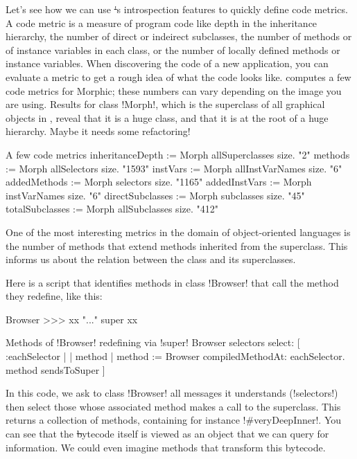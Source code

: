 \documentclass[a4paper,10pt,twoside]{book}
\begin{document}
Let's see how we can use \st's introspection features to quickly define code metrics.
A code metric is a measure of program code like depth in the inheritance hierarchy, the number of direct or indeirect subclasses, the number of methods or of instance variables in each class, or the number of locally defined methods or instance variables.
When discovering the code of a new application, you can evaluate a metric to get a rough idea of what the code looks like.
 computes a few code metrics for Morphic; these numbers can vary depending on the image you are using.
Results for class \ct!Morph!, which is the superclass of all graphical objects in \sq, reveal that it is a huge class, and that it is at the root of a huge hierarchy. Maybe it needs some refactoring!

\begin{script}[metrics]{A few code metrics}
	inheritanceDepth := Morph allSuperclasses size. "2"
	methods := Morph allSelectors size. "1593"
	instVars := Morph allInstVarNames size. "6"
	addedMethods := Morph selectors size. "1165"
	addedInstVars := Morph instVarNames size. "6"
	directSubclasses := Morph subclasses size. "45"
	totalSubclasses := Morph allSubclasses size. "412"
\end{script}

One of the most interesting metrics in the domain of object-oriented languages is the number of methods that extend methods inherited from the superclass.
This informs us about the relation between the class and its superclasses.

Here is a script that identifies methods in class \ct!Browser! that call the method they redefine, like this:
\begin{code}{}
Browser >>> xx
	"..."
	super xx
\end{code}

\begin{script}[browsersendstosuper]{Methods of \ct!Browser! redefining via \ct!super!}
Browser selectors select: [ :eachSelector |
	| method |
	method := Browser compiledMethodAt: eachSelector.
	method sendsToSuper ]
\end{script}

In this code, we ask to class \ct!Browser! all messages it understands (\ct!selectors!) then select those whose associated method makes a call to the superclass.
This returns a collection of methods, containing for instance \ct!#veryDeepInner!.
You can see that the \st bytecode itself is viewed as an object that we can query for information.
We could even imagine methods that transform this bytecode.
\end{document}

